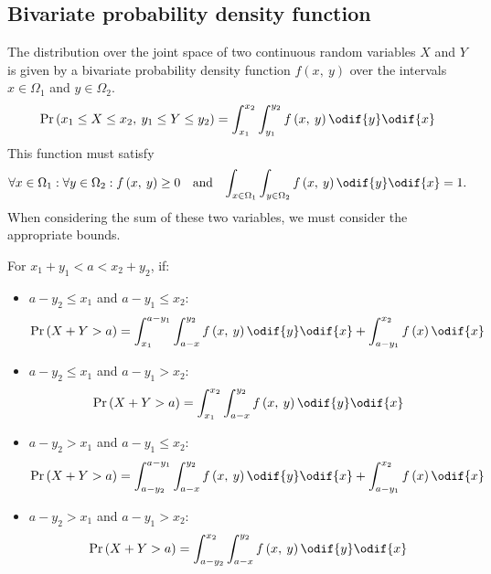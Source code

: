 \documentclass{article}
\begin{document}
\begin{multicols}{3}
    \subsection{Bivariate probability density function}
    The distribution over the joint space of two continuous random variables \(X\) and \(Y\) is  given by a
    bivariate probability density function \(f\left( x,\: y \right)\)
    over the intervals \(x \in \Omega_1\) and \(y \in \Omega_2\).
    \begin{equation*}
        \Pr{\left( x_1 \leq X \leq x_2,\: y_1 \leq Y \leq y_2 \right)} = \int_{x_1}^{x_2} \int_{y_1}^{y_2} f\left( x,\: y \right) \odif{y} \odif{x}
    \end{equation*}
    This function must satisfy
    \begin{align*}
        \forall x \in \Omega_1 : \forall y \in \Omega_2 : f\left( x,\: y \right) \geq 0 &  & \text{and} &  &
        \int_{x \in \Omega_1} \int_{y \in \Omega_2} f\left( x,\: y \right) \odif{y} \odif{x} = 1.
    \end{align*}
    When considering the sum of these two variables, we must consider the appropriate bounds.

    For \(x_1 + y_1 < a < x_2 + y_2\), if:
    \begin{itemize}
        \item \(a - y_2 \leq x_1\) and \(a - y_1 \leq x_2\):
              \begin{equation*}
                  \Pr{\left( X + Y > a \right)} = \int_{x_1}^{a - y_1} \int_{a - x}^{y_2} f\left( x,\: y \right) \odif{y} \odif{x} + \int_{a - y_1}^{x_2} f\left( x \right) \odif{x}
              \end{equation*}
        \item \(a - y_2 \leq x_1\) and \(a - y_1 > x_2\):
              \begin{equation*}
                  \Pr{\left( X + Y > a \right)} = \int_{x_1}^{x_2} \int_{a - x}^{y_2} f\left( x,\: y \right) \odif{y} \odif{x}
              \end{equation*}
        \item \(a - y_2 > x_1\) and \(a - y_1 \leq x_2\):
              \begin{equation*}
                  \Pr{\left( X + Y > a \right)} = \int_{a - y_2}^{a - y_1} \int_{a - x}^{y_2} f\left( x,\: y \right) \odif{y} \odif{x} + \int_{a - y_1}^{x_2} f\left( x \right) \odif{x}
              \end{equation*}
        \item \(a - y_2 > x_1\) and \(a - y_1 > x_2\):
              \begin{equation*}
                  \Pr{\left( X + Y > a \right)} = \int_{a - y_2}^{x_2} \int_{a - x}^{y_2} f\left( x,\: y \right) \odif{y} \odif{x}
              \end{equation*}
    \end{itemize}

\end{multicols}
\end{document}
